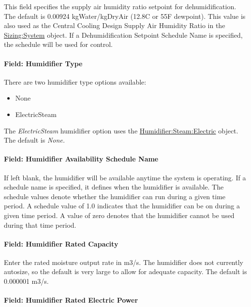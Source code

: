 This field specifies the supply air humidity ratio setpoint for dehumidification. The default is 0.00924 kgWater/kgDryAir (12.8C or 55F dewpoint). This value is also used as the Central Cooling Design Supply Air Humidity Ratio in the \hyperref[sizingsystem]{Sizing:System} object. If a Dehumidification Setpoint Schedule Name is specified, the schedule will be used for control.

\paragraph{Field: Humidifier Type}\label{field-humidifier-type-7}

There are two humidifier type options available:

\begin{itemize}
\item
  None
\item
  ElectricSteam
\end{itemize}

The \emph{ElectricSteam} humidifier option uses the \hyperref[humidifiersteamelectric]{Humidifier:Steam:Electric} object. The default is \emph{None.}

\paragraph{Field: Humidifier Availability Schedule Name}\label{field-humidifier-availability-schedule-name-7}

If left blank, the humidifier will be available anytime the system is operating. If a schedule name is specified, it defines when the humidifier is available. The schedule values denote whether the humidifier can run during a given time period. A schedule value of 1.0 indicates that the humidifier can be on during a given time period. A value of zero denotes that the humidifier cannot be used during that time period.

\paragraph{Field: Humidifier Rated Capacity}\label{field-humidifier-rated-capacity-7}

Enter the rated moisture output rate in m3/s. The humidifier does not currently autosize, so the default is very large to allow for adequate capacity. The default is 0.000001 m3/s.

\paragraph{Field: Humidifier Rated Electric Power}\label{field-humidifier-rated-electric-power-7}

